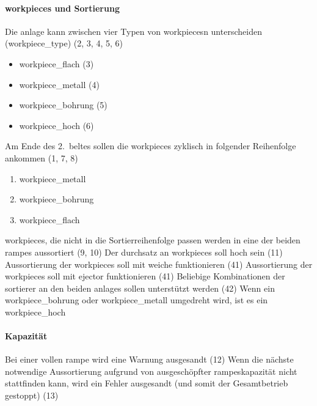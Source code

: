 \paragraph{\glspl{workpiece} und Sortierung}
\begin{itemize}
     Die \gls{anlage} kann zwischen vier Typen von \glspl{workpiece}n unterscheiden (\gls{workpiece_type}) (2, 3, 4, 5, 6)
    \begin{itemize}
        \item \gls{workpiece_flach} (3)
        \item \gls{workpiece_metall} (4)
        \item \gls{workpiece_bohrung} (5)
        \item \gls{workpiece_hoch} (6)
    \end{itemize}
     Am Ende des 2.\ \gls{belt}es sollen die \glspl{workpiece} zyklisch in folgender Reihenfolge ankommen (1, 7, 8)
    \begin{enumerate}
        \item \gls{workpiece_metall}
        \item \gls{workpiece_bohrung}
        \item \gls{workpiece_flach}
    \end{enumerate}
     \glspl{workpiece}, die nicht in die Sortierreihenfolge passen werden in eine der beiden \glspl{rampe} aussortiert (9, 10)
     Der \gls{durchsatz} an \glspl{workpiece} soll hoch sein (11)
     Aussortierung der \glspl{workpiece} soll mit \gls{weiche} funktionieren (41)
     Aussortierung der \glspl{workpiece} soll mit \gls{ejector} funktionieren (41)
     Beliebige Kombinationen der \gls{sortierer} an den beiden \glspl{anlage} sollen unterstützt werden (42)
     Wenn ein \gls{workpiece_bohrung} oder \gls{workpiece_metall} umgedreht wird, ist es ein \gls{workpiece_hoch}
\end{itemize}

\paragraph{Kapazität}
\begin{itemize}
     Bei einer vollen \gls{rampe} wird eine Warnung ausgesandt (12)
     Wenn die nächste notwendige Aussortierung aufgrund von ausgeschöpfter \glspl{rampe}kapazität
    nicht stattfinden kann, wird ein Fehler ausgesandt (und somit der Gesamtbetrieb gestoppt) (13)
\end{itemize}


